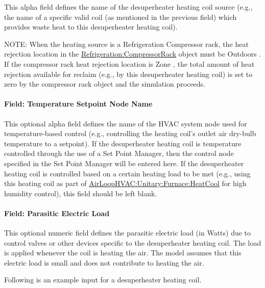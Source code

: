 This alpha field defines the name of the desuperheater heating coil source (e.g., the name of a specific valid coil (as mentioned in the previous field) which provides waste heat to this desuperheater heating coil).

NOTE: When the heating source is a Refrigeration Compressor rack, the heat rejection location in the \hyperref[refrigerationcompressorrack]{Refrigeration:CompressorRack} object must be Outdoors . If the compressor rack heat rejection location is Zone , the total amount of heat rejection available for reclaim (e.g., by this desuperheater heating coil) is set to zero by the compressor rack object and the simulation proceeds.

\paragraph{Field: Temperature Setpoint Node Name}\label{field-temperature-setpoint-node-name-3}

This optional alpha field defines the name of the HVAC system node used for temperature-based control (e.g., controlling the heating coil's outlet air dry-bulb temperature to a setpoint). If the desuperheater heating coil is temperature controlled through the use of a Set Point Manager, then the control node specified in the Set Point Manager will be entered here. If the desuperheater heating coil is controlled based on a certain heating load to be met (e.g., using this heating coil as part of \hyperref[airloophvacunitaryfurnaceheatcool]{AirLoopHVAC:Unitary:Furnace:HeatCool} for high humidity control), this field should be left blank.

\paragraph{Field: Parasitic Electric Load}\label{field-parasitic-electric-load}

This optional numeric field defines the parasitic electric load (in Watts) due to control valves or other devices specific to the desuperheater heating coil. The load is applied whenever the coil is heating the air. The model assumes that this electric load is small and does not contribute to heating the air.

Following is an example input for a desuperheater heating coil.

